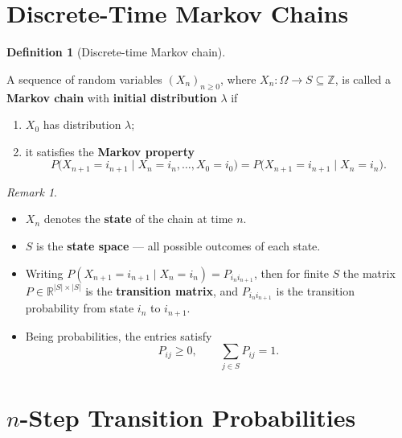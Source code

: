 \documentclass[
  letterpaper,
  DIV=11,
  numbers=noendperiod]{scrreprt}
\providecommand{\tightlist}{%
  \setlength{\itemsep}{0pt}\setlength{\parskip}{0pt}}
\theoremstyle{definition}
\newtheorem{definition}{Definition}[chapter]
\theoremstyle{plain}
\theoremstyle{plain}
\theoremstyle{definition}
\theoremstyle{plain}
\theoremstyle{plain}
\theoremstyle{remark}
\newtheorem*{remark}{Remark}
\begin{document}
\section{Discrete-Time Markov Chains}\label{discrete-time-markov-chains}

\begin{definition}[Discrete-time Markov
chain]\protect\hypertarget{def-markov-chain}{}\label{def-markov-chain}

A sequence of random variables \((X_n)_{n \ge 0}\), where
\(X_n : \Omega \to S \subseteq \mathbb{Z}\), is called a \textbf{Markov
chain} with \textbf{initial distribution} \(\lambda\) if

\begin{enumerate}
\def\labelenumi{\alph{enumi})}
\tightlist
\item
  \(X_0\) has distribution \(\lambda\);
\item
  it satisfies the \textbf{Markov property} \[
  P\big(X_{n+1} = i_{n+1} \mid X_n = i_n, \dots, X_0 = i_0\big)
  = P\big(X_{n+1} = i_{n+1} \mid X_n = i_n\big) .
  \]
\end{enumerate}

\end{definition}

\begin{remark}
\leavevmode

\begin{itemize}
\tightlist
\item
  \(X_n\) denotes the \textbf{state} of the chain at time \(n\).
\item
  \(S\) is the \textbf{state space} --- all possible outcomes of each
  state.
\item
  Writing \(P(X_{n+1} = i_{n+1} \mid X_n = i_n) = P_{i_n i_{n+1}}\),
  then for finite \(S\) the matrix \(P \in \mathbb{R}^{|S| \times |S|}\)
  is the \textbf{transition matrix}, and \(P_{i_n i_{n+1}}\) is the
  transition probability from state \(i_n\) to \(i_{n+1}\).
\item
  Being probabilities, the entries satisfy \[
  P_{ij} \ge 0, \qquad \sum_{j \in S} P_{ij} = 1 .
  \]
\end{itemize}

\end{remark}

\section{\texorpdfstring{\(n\)-Step Transition
Probabilities}{n-Step Transition Probabilities}}\label{n-step-transition-probabilities}
\end{document}
